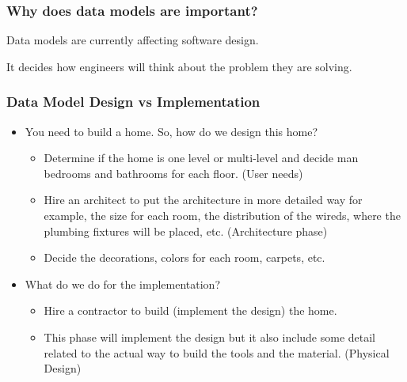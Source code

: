 
\begin{frame}
\frametitle{Why does data models are important?}
\begin{wideitemize}	
\item Data models are currently affecting software design. 
\item It decides how engineers will think about the problem they are solving.
\end{wideitemize}
\end{frame}

\begin{frame}
\frametitle{Data Model Design vs Implementation}
\begin{itemize}[<+->]
\item You need to build a home. So, how do we design this home?
\begin{itemize}[<+->]
\item Determine if the home is one level or multi-level and decide man bedrooms and bathrooms for each floor. (User needs)
\item Hire an architect to put the architecture in more detailed way for example, the size for each room, the distribution of the wireds, where the plumbing fixtures will be placed, etc. (Architecture phase)
\item Decide the decorations, colors for each room, carpets, etc. 
\end{itemize}
\item What do we do for the implementation?
\begin{itemize}[<+->]
\item Hire a contractor to build (implement the design) the home. 
\item This phase will implement the design but it also include some detail related to the actual way to build the tools and the material. (Physical Design)
\end{itemize}		
\end{itemize}
\end{frame}


